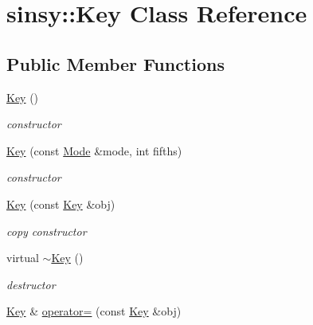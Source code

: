 \hypertarget{classsinsy_1_1Key}{\section{sinsy\-:\-:\-Key \-Class \-Reference}
\label{classsinsy_1_1Key}
}
\subsection*{\-Public \-Member \-Functions}
\begin{DoxyCompactItemize}
\item 
\hypertarget{classsinsy_1_1Key_a22e51dbebb18c1d33ee8bba93a1b3b4d}{\hyperlink{classsinsy_1_1Key_a22e51dbebb18c1d33ee8bba93a1b3b4d}{\-Key} ()}\label{classsinsy_1_1Key_a22e51dbebb18c1d33ee8bba93a1b3b4d}

\begin{DoxyCompactList}\small\item\em constructor \end{DoxyCompactList}\item 
\hyperlink{classsinsy_1_1Key_a3065863c97c7805e454248655aaa0c92}{\-Key} (const \hyperlink{classsinsy_1_1Mode}{\-Mode} \&mode, int fifths)
\begin{DoxyCompactList}\small\item\em constructor \end{DoxyCompactList}\item 
\hypertarget{classsinsy_1_1Key_ae21c8e651ab4b4994f28cc339b809886}{\hyperlink{classsinsy_1_1Key_ae21c8e651ab4b4994f28cc339b809886}{\-Key} (const \hyperlink{classsinsy_1_1Key}{\-Key} \&obj)}\label{classsinsy_1_1Key_ae21c8e651ab4b4994f28cc339b809886}

\begin{DoxyCompactList}\small\item\em copy constructor \end{DoxyCompactList}\item 
\hypertarget{classsinsy_1_1Key_a92ff6ee5df282f6d7abb893fd14d81af}{virtual \hyperlink{classsinsy_1_1Key_a92ff6ee5df282f6d7abb893fd14d81af}{$\sim$\-Key} ()}\label{classsinsy_1_1Key_a92ff6ee5df282f6d7abb893fd14d81af}

\begin{DoxyCompactList}\small\item\em destructor \end{DoxyCompactList}\item 
\hypertarget{classsinsy_1_1Key_a2491a5000197f4b105a11c21b96c6afe}{\hyperlink{classsinsy_1_1Key}{\-Key} \& \hyperlink{classsinsy_1_1Key_a2491a5000197f4b105a11c21b96c6afe}{operator=} (const \hyperlink{classsinsy_1_1Key}{\-Key} \&obj)}\label{classsinsy_1_1Key_a2491a5000197f4b105a11c21b96c6afe}


\end{DoxyCompactItemize}
